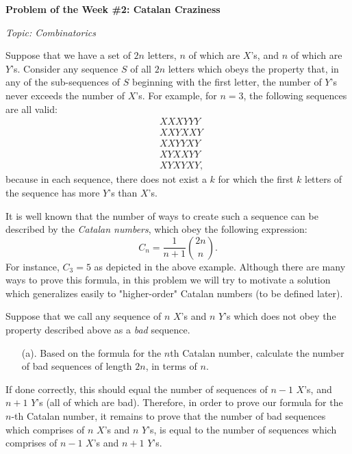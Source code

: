 \documentclass{article}
\newcommand{\V}{

\vspace{\baselineskip}

}
\begin{document}
\begin{potw}\vspace{5pt}
{\large\textbf{Problem of the Week \#2: Catalan Craziness}}\vspace{5pt}

\textit{Topic: Combinatorics}\V

Suppose that we have a set of $2n$ letters, $n$ of which are $X$'s, and $n$ of which are $Y$'s. Consider any sequence $S$ of all $2n$ letters which obeys the property that, in any of the sub-sequences of $S$ beginning with the first letter, the number of $Y$'s never exceeds the number of $X$'s. For example, for $n=3$, the following sequences are all valid:
\begin{align*}
    &XXXYYY \\
    &XXYXXY \\
    &XXYYXY \\
    &XYXXYY \\
    &XYXYXY, 
\end{align*}
because in each sequence, there does not exist a $k$ for which the first $k$ letters of the sequence has more $Y$'s than $X$'s. \V

It is well known that the number of ways to create such a sequence can be described by the \textit{Catalan numbers}, which obey the following expression: 
\[C_n = \frac{1}{n+1}\binom{2n}{n}.\]
For instance, $C_3=5$ as depicted in the above example. Although there are many ways to prove this formula, in this problem we will try to motivate a solution which generalizes easily to "higher-order" Catalan numbers (to be defined later). \V

Suppose that we call any sequence of $n$ $X$'s and $n$ $Y$'s which does not obey the property described above as a \textit{bad} sequence.

\begin{enumerate}
    \item [(a).] Based on the formula for the $n$th Catalan number, calculate the number of bad sequences of length $2n$, in terms of $n$.
\end{enumerate}

If done correctly, this should equal the number of sequences of $n-1$ $X$'s, and $n+1$ $Y$'s (all of which are bad). Therefore, in order to prove our formula for the $n$-th Catalan number, it remains to prove that the number of bad sequences which comprises of $n$ $X$'s and $n$ $Y$'s, is equal to the number of sequences which comprises of $n-1$ $X$'s and $n+1$ $Y$'s.


\end{potw}
\end{document}
